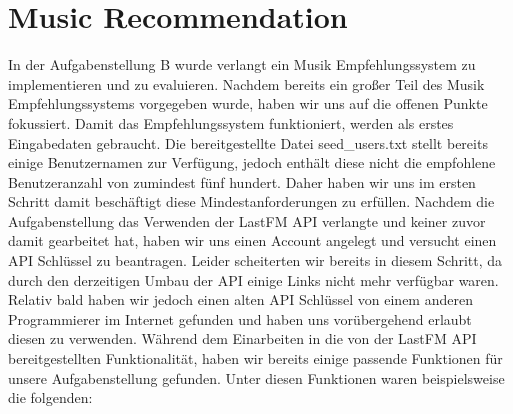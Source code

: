 \documentclass[prodmode,acmtecs]{acmsmall} %
\begin{document}
\section{Music Recommendation}
In der Aufgabenstellung B wurde verlangt ein Musik Empfehlungssystem zu implementieren und zu evaluieren. Nachdem bereits ein großer Teil des Musik Empfehlungssystems vorgegeben wurde, haben wir uns auf die offenen Punkte fokussiert. Damit das Empfehlungssystem funktioniert, werden als erstes Eingabedaten gebraucht. Die bereitgestellte Datei seed\_users.txt stellt bereits einige Benutzernamen zur Verfügung, jedoch enthält diese nicht die empfohlene Benutzeranzahl von zumindest fünf hundert. Daher haben wir uns im ersten Schritt damit beschäftigt diese Mindestanforderungen zu erfüllen. Nachdem die Aufgabenstellung das Verwenden der LastFM API verlangte und keiner zuvor damit gearbeitet hat, haben wir uns einen Account angelegt und versucht einen API Schlüssel zu beantragen. Leider scheiterten wir bereits in diesem Schritt, da durch den derzeitigen Umbau der API einige Links nicht mehr verfügbar waren. Relativ bald haben wir jedoch einen alten API Schlüssel von einem anderen Programmierer im Internet gefunden und haben uns vorübergehend erlaubt diesen zu verwenden. Während dem Einarbeiten in die von der LastFM API bereitgestellten Funktionalität, haben wir bereits einige passende Funktionen für unsere Aufgabenstellung gefunden. Unter diesen Funktionen waren beispielsweise die folgenden:
\end{document}

